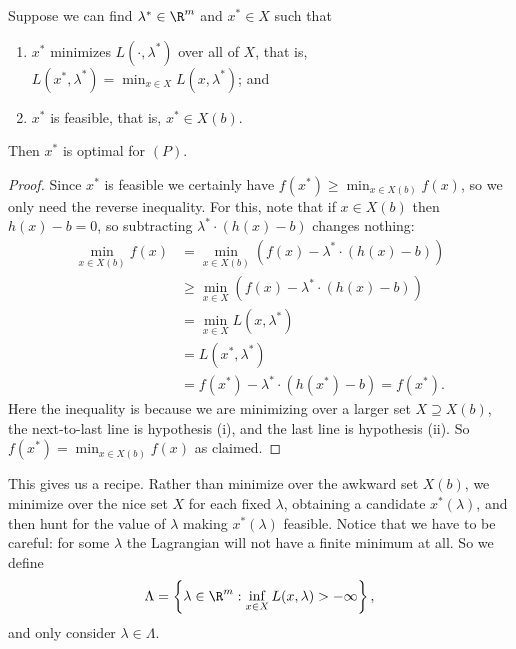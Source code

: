 \begin{theorem}
    Suppose we can find $\lambda^* \in \R^m$ and $x^* \in X$ such that
    \begin{enumerate}[label=(\roman*)]
        \item $x^*$ minimizes $L(\cdot, \lambda^*)$ over all of $X$, that is, $L(x^*, \lambda^*) = \min_{x \in X} L(x, \lambda^*)$; and
        \item $x^*$ is feasible, that is, $x^* \in X(b)$.
    \end{enumerate}
    Then $x^*$ is optimal for $(P)$.
\end{theorem}
\begin{proof}
    Since $x^*$ is feasible we certainly have $f(x^*) \geq \min_{x \in X(b)}f(x)$, so we only need the reverse inequality. For this, note that if $x \in X(b)$ then $h(x) - b = 0$, so subtracting $\lambda^* \cdot (h(x) - b)$ changes nothing:
    \begin{align*}
        \min_{x \in X(b)}f(x) &= \min_{x \in X(b)}\left(f(x) - \lambda^*\cdot(h(x) - b)\right)\\
        &\geq \min_{x \in X}\left(f(x) - \lambda^*\cdot(h(x) - b)\right) \\
        &= \min_{x \in X}L(x, \lambda^*) \\
        &= L(x^*, \lambda^*) \\
        &= f(x^*) - \lambda^* \cdot (h(x^*) - b) = f(x^*).
    \end{align*}
    Here the inequality is because we are minimizing over a larger set $X \supseteq X(b)$, the next-to-last line is hypothesis (i), and the last line is hypothesis (ii). So $f(x^*) = \min_{x \in X(b)}f(x)$ as claimed.
\end{proof}

This gives us a recipe. Rather than minimize over the awkward set $X(b)$, we minimize over the nice set $X$ for each fixed $\lambda$, obtaining a candidate $x^*(\lambda)$, and then hunt for the value of $\lambda$ making $x^*(\lambda)$ feasible. Notice that we have to be careful: for some $\lambda$ the Lagrangian will not have a finite minimum at all. So we define
$$
\Lambda = \left\{\lambda \in \R^m : \inf_{x \in X}L(x, \lambda) > -\infty\right\},
$$
and only consider $\lambda \in \Lambda$.

